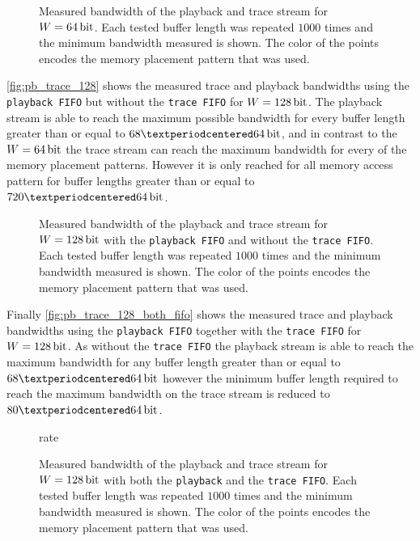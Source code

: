 \begin{figure}[!htbp]
\label{fig:pb_trace_64}
\caption{Measured bandwidth of the playback and trace stream for $W = \SI{64}{\bit}$. Each tested buffer length was repeated $\num{1000}$ times and the minimum bandwidth measured is shown. The color of the points encodes the memory placement pattern that was used.}
\end{figure}

\autoref{fig:pb_trace_128} shows the measured trace and playback bandwidths using the \texttt{playback FIFO} but without the \texttt{trace FIFO} for $W = \SI{128}{\bit}$. The playback stream is able to reach the maximum possible bandwidth for every buffer length greater than or equal to $\num{68} · \PhyWordSize$, and in contrast to the $W = \SI{64}{\bit}$ the trace stream can reach the maximum bandwidth for every of the memory placement patterns. However it is only reached for all memory access pattern for buffer lengths greater than or equal to $\num{720} · \PhyWordSize$.
\begin{figure}[!htbp]
\label{fig:pb_trace_128}
\caption{Measured bandwidth of the playback and trace stream for $W = \SI{128}{\bit}$ with the \texttt{playback FIFO} and without the \texttt{trace FIFO}. Each tested buffer length was repeated $\num{1000}$ times and the minimum bandwidth measured is shown. The color of the points encodes the memory placement pattern that was used.}
\end{figure}

Finally \autoref{fig:pb_trace_128_both_fifo} shows the measured trace and playback bandwidths using the \texttt{playback FIFO} together with the \texttt{trace FIFO} for $W = \SI{128}{\bit}$. As without the \texttt{trace FIFO} the playback stream is able to reach the maximum bandwidth for any buffer length greater than or equal to $\num{68} · \PhyWordSize$ however the minimum buffer length required to reach the maximum bandwidth on the trace stream is reduced to $80 · \PhyWordSize$.

\begin{figure}[!htbp]
\label{fig:pb_trace_128_both_fifo}
\caption{rate}
\caption{Measured bandwidth of the playback and trace stream for $W = \SI{128}{\bit}$ with both the \texttt{playback} and the \texttt{trace FIFO}. Each tested buffer length was repeated $\num{1000}$ times and the minimum bandwidth measured is shown. The color of the points encodes the memory placement pattern that was used.}
\end{figure}

